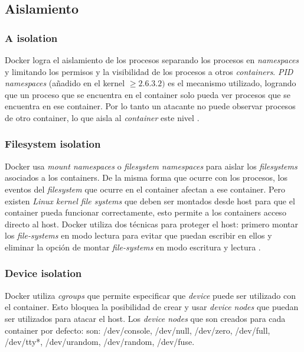 	\subsection{Aislamiento}
	\subsubsection{A isolation}
	
	Docker logra el aislamiento de los procesos separando los procesos en \emph{namespaces} y limitando los permisos y la visibilidad de los procesos a otros \emph{containers}. \emph{PID namespaces} (añadido en el kernel \( \geq 2.6.3.2)\) es el mecanismo utilizado, logrando que un proceso que se encuentra en el container solo pueda ver procesos que se encuentra en ese container. Por lo tanto un atacante no puede observar procesos de otro container, lo que aisla al  \textit{container} este nivel \cite{bui2015analysis, LVM:2015:Online}.
	
	\subsubsection{Filesystem isolation}
	
	Docker usa \emph{mount namespaces} o \emph{filesystem namespaces} para aislar los \emph{filesystems} asociados a los containers. De la misma forma que ocurre con los procesos, los eventos del \emph{filesystem} que ocurre en el container afectan a ese container.
	Pero existen \emph{Linux kernel file systems} que deben ser montados desde host para que el container pueda funcionar correctamente, esto permite a los containers acceso directo al host. Docker utiliza dos técnicas para proteger el host: primero montar los \emph{file-systems} en modo lectura para evitar que puedan escribir en ellos y eliminar la opción de montar \emph{file-systems} en modo escritura y lectura \cite{walsh:2014:Online}.
	
	\subsubsection{Device isolation}
	Docker utiliza \emph{cgroups} que permite especificar que \emph{device} puede ser utilizado con el container. Esto bloquea la posibilidad de crear y usar \emph{device nodes} que puedan ser utilizados para atacar el host. Los \emph{device nodes} que son creados para cada container por defecto: son: /dev/console, /dev/null, /dev/zero, /dev/full, /dev/tty*, /dev/urandom, /dev/random, /dev/fuse. \cite{walsh:2014:Online}
	
